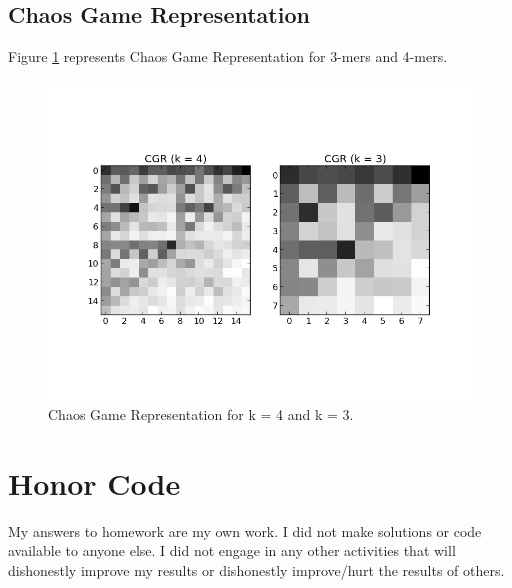 \documentclass[a4paper,11pt]{article}
\begin{document}
\subsection{Chaos Game Representation}
Figure \ref{cgr} represents Chaos Game Representation for 3-mers and 4-mers.
\begin{figure}[h!]
\begin{center}
\includegraphics[scale=0.8]{4_cgr.png}
\caption{Chaos Game Representation for k = 4 and k = 3.}
\label{cgr}
\end{center}
\end{figure}

\section*{Honor Code}


My answers to homework are my own work. I did not make solutions or code available to anyone else. I did not engage in any other activities that will dishonestly improve my results or dishonestly improve/hurt the results of others.
\end{document}
